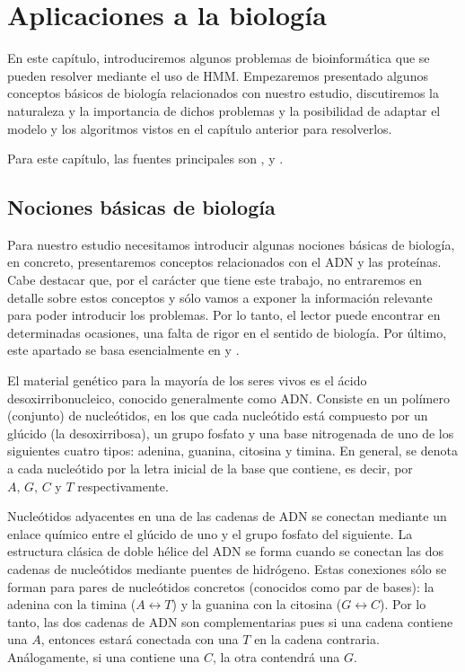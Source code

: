 \chapter{Aplicaciones a la biología}

En este capítulo, introduciremos algunos problemas de bioinformática que se pueden resolver mediante el uso de HMM. Empezaremos presentado algunos conceptos básicos de biología relacionados con nuestro estudio, discutiremos la naturaleza y la importancia de dichos problemas y la posibilidad de adaptar el modelo y los algoritmos vistos en el capítulo anterior para resolverlos.

Para este capítulo, las fuentes principales son \cite{Durbin}, \cite{Yoon} y \cite[Capítulo 8]{Vidyasagar}.

\section{Nociones básicas de biología}
Para nuestro estudio necesitamos introducir algunas nociones básicas de biología, en concreto, presentaremos conceptos relacionados con el ADN y las proteínas. Cabe destacar que, por el carácter que tiene este trabajo, no entraremos en detalle sobre estos conceptos y sólo vamos a exponer la información relevante para poder introducir los problemas. Por lo tanto, el lector puede encontrar en determinadas ocasiones, una falta de rigor en el sentido de biología. Por último, este apartado se basa esencialmente en \cite[Capítulo 8]{Vidyasagar} y \cite[Apéndice A]{Warren}.

El material genético para la mayoría de los seres vivos es el ácido desoxirribonucleico, conocido generalmente como ADN. Consiste en un polímero (conjunto) de nucleótidos, en los que cada nucleótido está compuesto por un glúcido (la desoxirribosa), un grupo fosfato y una base nitrogenada de uno de los siguientes cuatro tipos: adenina, guanina, citosina y timina. En general, se denota a cada nucleótido por la letra inicial de la base que contiene, es decir, por $A,\, G,\, C$ y $T$ respectivamente. 

Nucleótidos adyacentes en una de las cadenas de ADN se conectan mediante un enlace químico entre el glúcido de uno y el grupo fosfato del siguiente. La estructura clásica de doble hélice del ADN se forma cuando se conectan las dos cadenas de nucleótidos mediante puentes de hidrógeno. Estas conexiones sólo se forman para pares de nucleótidos concretos (conocidos como par de bases): la adenina con la timina ($A\leftrightarrow T$) y la guanina con la citosina ($G\leftrightarrow C$). Por lo tanto, las dos cadenas de ADN son complementarias pues si una cadena contiene una $A$, entonces estará conectada con una $T$ en la cadena contraria. Análogamente, si una contiene una $C$, la otra contendrá una $G$. 

